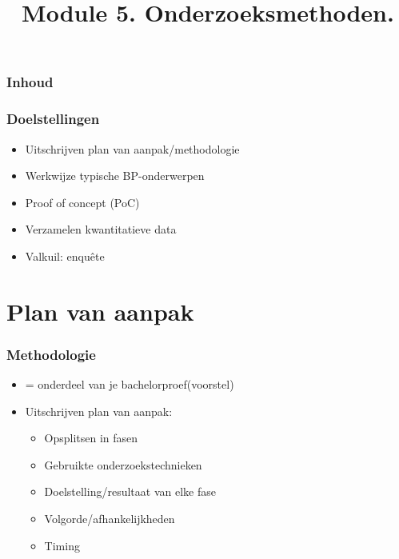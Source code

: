 \documentclass[aspectratio=169]{beamer}
\title{Module 5. Onderzoeksmethoden.}
\subtitle{\coursename}
\author{\lecturers}   %
\date{\academicyear}
\begin{document}
\begin{frame}
  \maketitle
\end{frame}

\begin{frame}
  \frametitle{Inhoud}

  \tableofcontents
\end{frame}

\begin{frame}
  \frametitle{Doelstellingen}

  \begin{itemize}
    \item Uitschrijven plan van aanpak/methodologie
    \item Werkwijze typische BP-onderwerpen
    \item Proof of concept (PoC)
    \item Verzamelen kwantitatieve data
    \item Valkuil: enquête
  \end{itemize}

\end{frame}

\section{Plan van aanpak}

\begin{frame}
  \frametitle{Methodologie}

  \begin{itemize}
    \item = onderdeel van je bachelorproef(voorstel)
    \item Uitschrijven plan van aanpak:
          \begin{itemize}
            \item Opsplitsen in fasen
            \item Gebruikte onderzoekstechnieken
            \item Doelstelling/resultaat van elke fase
            \item Volgorde/afhankelijkheden
            \item Timing
          \end{itemize}
  \end{itemize}


\end{frame}
\end{document}
